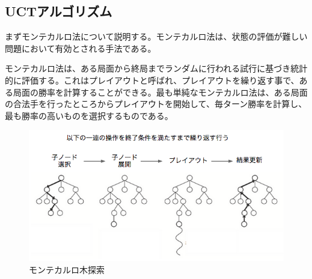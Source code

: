 \documentclass[a4, 10pt,dvipdfmx]{jsarticle}
\begin{document}





\subsection{UCTアルゴリズム}

まずモンテカルロ法について説明する。モンテカルロ法は、状態の評価が難しい問題において有効とされる手法である。

モンテカルロ法は、ある局面から終局までランダムに行われる試行に基づき統計的に評価する。これはプレイアウトと呼ばれ、プレイアウトを繰り返す事で、ある局面の勝率を計算することができる。最も単純なモンテカルロ法は、ある局面の合法手を行ったところからプレイアウトを開始して、毎ターン勝率を計算し、最も勝率の高いものを選択するものである。

\begin{figure}[b]
    \begin{center}
      \includegraphics[width=120mm]{img/monte_carlo.png}
    \end{center}
    \caption{モンテカルロ木探索~\cite{kocsis2006bandit}}
    \label{monte_carlo}
\end{figure}
\end{document}
